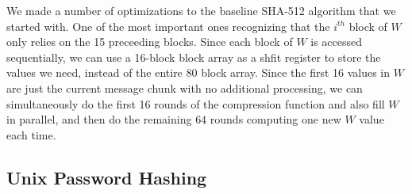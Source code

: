We made a number of optimizations to the baseline SHA-512 algorithm that we started with. One of the
most important ones recognizing that the $i^{th}$ block of $W$ only relies on the 15 preceeding blocks.
Since each block of $W$ is accessed sequentially, we can use a 16-block block array as a shfit register
to store the values we need, instead of the entire 80 block array. Since the first 16 values in $W$ are
just the current message chunk with no additional processing, we can simultaneously do the first 16
rounds of the compression function and also fill $W$ in parallel, and then do the remaining $64$ rounds
computing one new $W$ value each time.

\subsection{Unix Password Hashing}


